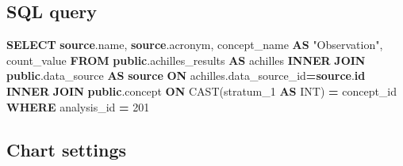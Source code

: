 \documentclass[
]{book}
\newenvironment{Shaded}{\begin{snugshade}}{\end{snugshade}}
\newcommand{\DataTypeTok}[1]{\textcolor[rgb]{0.13,0.29,0.53}{#1}}
\newcommand{\DecValTok}[1]{\textcolor[rgb]{0.00,0.00,0.81}{#1}}
\newcommand{\FunctionTok}[1]{\textcolor[rgb]{0.00,0.00,0.00}{#1}}
\newcommand{\KeywordTok}[1]{\textcolor[rgb]{0.13,0.29,0.53}{\textbf{#1}}}
\newcommand{\NormalTok}[1]{#1}
\newcommand{\OperatorTok}[1]{\textcolor[rgb]{0.81,0.36,0.00}{\textbf{#1}}}
\newcommand{\OtherTok}[1]{\textcolor[rgb]{0.56,0.35,0.01}{#1}}
\begin{document}
\hypertarget{sql-query-18}{%
\subsection{SQL query}\label{sql-query-18}}

\begin{Shaded}
\begin{Highlighting}[]
\KeywordTok{SELECT} \KeywordTok{source}\NormalTok{.name, }
       \KeywordTok{source}\NormalTok{.acronym,}
\NormalTok{       concept\_name }\KeywordTok{AS} \OtherTok{"Observation"}\NormalTok{, }
\NormalTok{       count\_value}
\KeywordTok{FROM} \KeywordTok{public}\NormalTok{.achilles\_results }\KeywordTok{AS}\NormalTok{ achilles }
\KeywordTok{INNER} \KeywordTok{JOIN} \KeywordTok{public}\NormalTok{.data\_source }\KeywordTok{AS} \KeywordTok{source} \KeywordTok{ON}\NormalTok{ achilles.data\_source\_id}\OperatorTok{=}\KeywordTok{source}\NormalTok{.}\KeywordTok{id}
\KeywordTok{INNER} \KeywordTok{JOIN} \KeywordTok{public}\NormalTok{.concept }\KeywordTok{ON} \FunctionTok{CAST}\NormalTok{(stratum\_1 }\KeywordTok{AS} \DataTypeTok{INT}\NormalTok{) }\OperatorTok{=}\NormalTok{ concept\_id}
\KeywordTok{WHERE}\NormalTok{ analysis\_id }\OperatorTok{=} \DecValTok{201}
\end{Highlighting}
\end{Shaded}

\hypertarget{chart-settings-18}{%
\subsection{Chart settings}\label{chart-settings-18}}
\end{document}
